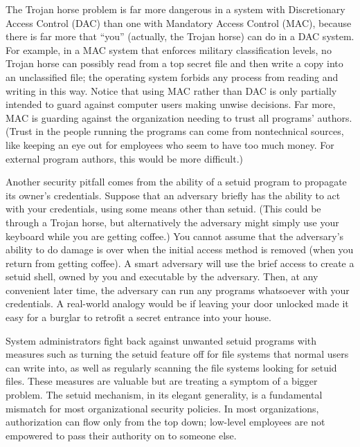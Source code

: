 The Trojan horse problem is far more dangerous in
a system with Discretionary Access Control (DAC)
than one with Mandatory Access Control (MAC), because there is
far more that ``you'' (actually, the Trojan horse) can do in a DAC
system.  For example, in a MAC system that enforces military
classification levels, no Trojan horse can possibly read from a
top secret file and then write a copy into an unclassified file; the
operating system forbids any process from reading and writing
in this way.  Notice that using MAC rather than DAC is only partially
intended to guard against computer users making unwise decisions.  Far
more, MAC is guarding against the organization needing to trust all
programs' authors.  (Trust in the people running the programs can come
from nontechnical sources, like keeping an eye out for employees who
seem to have too much money.  For external program authors, this would
be more difficult.)

Another security pitfall comes from the ability of a setuid program to
propagate its owner's credentials.  Suppose that an adversary briefly
has the ability to act with your credentials, using some means other
than setuid.  (This could be through a Trojan horse, but alternatively
the adversary might simply use your keyboard while you are getting
coffee.)  You cannot assume that the adversary's ability to do damage
is over when the initial access method is removed (when you
return from getting coffee).  A smart adversary will use the brief
access to create a setuid shell, owned by you and executable by the adversary.
Then, at any convenient later time, the adversary can run any programs
whatsoever with your credentials.  A real-world analogy would be if
leaving your door unlocked made it easy for a burglar to retrofit a
secret entrance into your house.

System administrators fight back against unwanted setuid programs with
measures such as turning the setuid feature off for file systems that
normal users can write into, as well as regularly scanning the file systems
looking for setuid files.  These measures are valuable but are
treating a symptom of a bigger problem.  The setuid mechanism, in its
elegant generality, is a fundamental mismatch for most organizational
security policies.  In most organizations, authorization can flow only
from the top down; low-level employees are not empowered to pass their
authority on to someone else.

